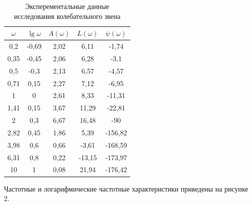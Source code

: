 \documentclass[a4paper, 11pt, russian]{article}
\begin{document}
    \begin{table}[ht!]
        \flushleft
        \caption{Эксперементальные данные исследования колебательного звена}
        \begin{tabular}{c|c|c|c|c}
            $\omega$ & $\lg{\omega}$ & $A(\omega)$ & $L(\omega)$ & $\psi(\omega)$\\
            \hline
            0,2 & -0,69 & 2,02 & 6,11 & -1,74\\
            \hline
            0,35 & -0,45 & 2,06 & 6,28 & -3,1\\
            \hline
            0,5 & -0,3 & 2,13 & 6,57 & -4,57\\
            \hline
            0,71 & 0,15 & 2,27 & 7,12 & -6,95\\
            \hline
            1 & 0 & 2,61 & 8,33 & -11,31\\
            \hline
            1,41 & 0,15 & 3,67 & 11,29 & -22,81\\
            \hline
            2 & 0,3 & 6,67 & 16,48 & -90\\ %
            \hline
            2,82 & 0,45 & 1,86 & 5,39 & -156,82\\
            \hline
            3,98 & 0,6 & 0,66 & -3,61 & -168,59\\
            \hline
            6,31 & 0,8 & 0,22 & -13,15 & -173,97\\
            \hline
            10 & 1 & 0,08 & 21,94 & -176,42
        \end{tabular}
    \end{table}
    \newpage
    Частотные и логарифмические частотные характеристики приведены на рисунке 2.
\end{document}
